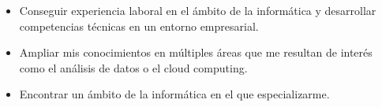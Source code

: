 


\begin{itemize}  
	\item Conseguir experiencia laboral en el ámbito de la informática y desarrollar competencias técnicas en un entorno empresarial.
	\item Ampliar mis conocimientos en múltiples áreas que me resultan de interés como el análisis de datos o el cloud computing.
	\item Encontrar un ámbito de la informática en el que especializarme. 
\end{itemize}